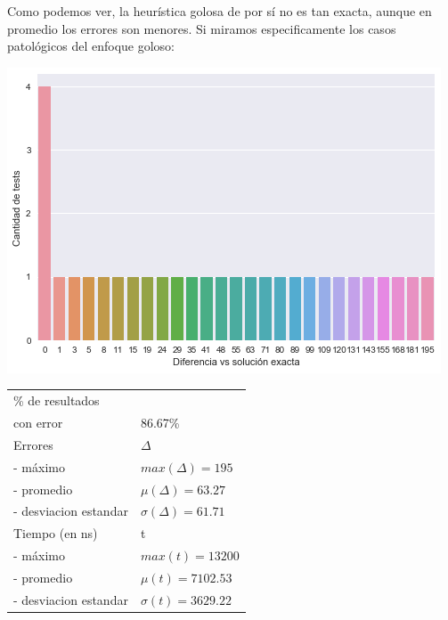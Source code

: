 Como podemos ver, la heurística golosa de por sí no es tan exacta, aunque en promedio los errores son menores. Si miramos especificamente los casos patológicos del enfoque goloso:

\noindent
\begin{minipage}{0.55\textwidth}
    \hfill
    \includegraphics[scale=0.6]{img/path-greedy.png}
\end{minipage}
\hfill
\begin{minipage}{0.44\textwidth}
    \begin{center}

        \begin{tabular}{ | l l |}
            \hline
            \% de resultados & \\
            con error & 86.67\% \\ \hline
            Errores & $\Delta$ \\
            - máximo & $max(\Delta) = 195$ \\
            - promedio & $\mu(\Delta) = 63.27$ \\
            - desviacion estandar & $\sigma(\Delta) = 61.71$ \\ \hline
            Tiempo (en ns) & t \\
            - máximo & $max(t) = 13200 $ \\
            - promedio & $\mu(t) = 7102.53$ \\
            - desviacion estandar & $\sigma(t) = 3629.22$ \\
            \hline
        \end{tabular}
    \end{center}
\end{minipage}


